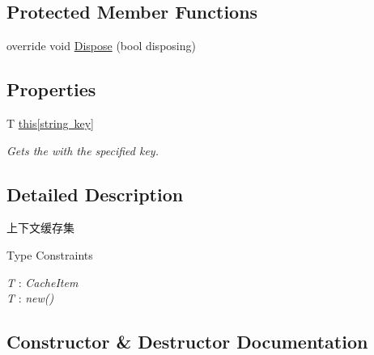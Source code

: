 \subsection*{Protected Member Functions}
\begin{DoxyCompactItemize}
\item 
override void \mbox{\hyperlink{class_t_net_1_1_cache_1_1_context_cache_set_ab9af16cc1243e8f1af74ad23577b5aea}{Dispose}} (bool disposing)
\end{DoxyCompactItemize}
\subsection*{Properties}
\begin{DoxyCompactItemize}
\item 
T \mbox{\hyperlink{class_t_net_1_1_cache_1_1_context_cache_set_a531aa68b88d3162196fc3c9f4faa884e}{this\mbox{[}string key\mbox{]}}}
\begin{DoxyCompactList}\small\item\em Gets the with the specified key. \end{DoxyCompactList}\end{DoxyCompactItemize}


\subsection{Detailed Description}
上下文缓存集 

\begin{Desc}
\item[Type Constraints]\begin{description}
\item[{\em T} : {\em Cache\+Item}]\item[{\em T} : {\em new()}]\end{description}
\end{Desc}


\subsection{Constructor \& Destructor Documentation}
\mbox{\label{class_t_net_1_1_cache_1_1_context_cache_set_a65e761d8d1a95e90a4d6ecd538d66578}} 
